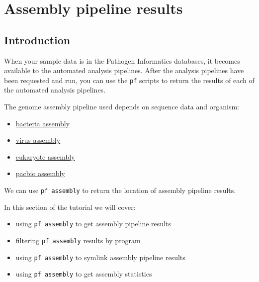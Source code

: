 \documentclass[11pt]{article}
\providecommand{\tightlist}{%
      \setlength{\itemsep}{0pt}\setlength{\parskip}{0pt}}
\begin{document}
\newpage






    \hypertarget{assembly-pipeline-results}{%
\section{Assembly pipeline results}\label{assembly-pipeline-results}}

    \hypertarget{introduction}{%
\subsection{Introduction}\label{introduction}}

When your sample data is in the Pathogen Informatics databases, it
becomes available to the automated analysis pipelines. After the
analysis pipelines have been requested and run, you can use the
\texttt{pf} scripts to return the results of each of the automated
analysis pipelines.

The genome assembly pipeline used depends on sequence data and organism:

\begin{itemize}
\tightlist
\item
  \href{http://mediawiki.internal.sanger.ac.uk/index.php/Pathogen_Informatics_Bacterial_Assembly_Pipeline}{bacteria
  assembly}
\item
  \href{http://mediawiki.internal.sanger.ac.uk/index.php/Pathogen_Informatics_Viral_Assembly_Pipeline}{virus
  assembly}
\item
  \href{http://mediawiki.internal.sanger.ac.uk/index.php/Pathogen_Informatics_Eukaryote_Assembly_Pipeline}{eukaryote
  assembly}
\item
  \href{http://mediawiki.internal.sanger.ac.uk/index.php/Pathogen_Informatics_Automated_PacBio_Assembly_Pipeline}{pacbio
  assembly}
\end{itemize}

We can use \texttt{pf\ assembly} to return the location of assembly
pipeline results.

In this section of the tutorial we will cover:

\begin{itemize}
\tightlist
\item
  using \texttt{pf\ assembly} to get assembly pipeline results
\item
  filtering \texttt{pf\ assembly} results by program
\item
  using \texttt{pf\ assembly} to symlink assembly pipeline results
\item
  using \texttt{pf\ assembly} to get assembly statistics
\end{itemize}
\end{document}
